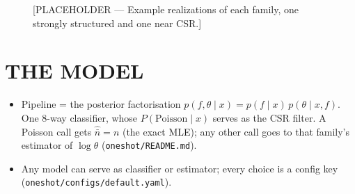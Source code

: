 \documentclass[twoside]{article}
\newcommand{\src}[1]{{\footnotesize\texttt{#1}}}
\newcommand{\nb}{\bar n}
\begin{document}
\begin{figure}[t]
\vspace{.3in}
\centerline{}
\vspace{.3in}
\caption{[PLACEHOLDER — Example realizations of each family, one strongly structured and one near CSR.]}
\label{fig:examples}
\end{figure}

\section{THE MODEL}

\begin{itemize}
  \item Pipeline = the posterior factorisation $p(f,\theta\mid x)=p(f\mid x)\,p(\theta\mid x,f)$. One 8-way
        classifier, whose $P(\text{Poisson}\mid x)$ serves as the CSR filter. A Poisson call gets $\hat{\nb}=n$ (the exact
        MLE); any other call goes to that family's estimator of $\log\theta$ (\src{oneshot/README.md}).
  \item Any model can serve as classifier or estimator; every choice is a config key
        (\src{oneshot/configs/default.yaml}).
\end{itemize}
\end{document}
